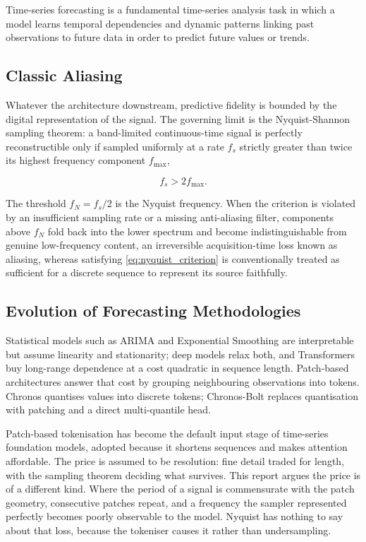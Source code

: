 Time-series forecasting is a fundamental time-series analysis task in which a model learns temporal dependencies and dynamic patterns linking past observations to future data in order to predict future values or trends\autocite{wangDeepTimeSeries2026}.

\subsection*{Classic Aliasing}
Whatever the architecture downstream, predictive fidelity is bounded by the digital representation of the signal. The governing limit is the Nyquist-Shannon sampling theorem: a band-limited continuous-time signal is perfectly reconstructible only if sampled uniformly at a rate $f_s$ strictly greater than twice its highest frequency component $f_{\max}$,

\begin{equation}
\label{eq:nyquist_criterion}
f_s > 2f_{\max}.
\end{equation}

The threshold $f_N = f_s/2$ is the Nyquist frequency. When the criterion is violated by an insufficient sampling rate or a missing anti-aliasing filter, components above $f_N$ fold back into the lower spectrum and become indistinguishable from genuine low-frequency content, an irreversible acquisition-time loss known as aliasing, whereas satisfying \autoref{eq:nyquist_criterion} is conventionally treated as sufficient for a discrete sequence to represent its source faithfully.

\subsection*{Evolution of Forecasting Methodologies}
Statistical models such as ARIMA and Exponential Smoothing\autocite[chs.~8--9]{hyndmanForecastingPrinciplesPractice2021} are interpretable but assume linearity and stationarity; deep models relax both, and Transformers buy long-range dependence at a cost quadratic in sequence length\autocite{wangDeepTimeSeries2026}. Patch-based architectures answer that cost by grouping neighbouring observations into tokens. Chronos quantises values into discrete tokens\autocite{ansariChronosLearningLanguage2024}; Chronos-Bolt replaces quantisation with patching and a direct multi-quantile head\autocite{ansariChronosLearningLanguage2024a,FastAccurateZeroshot2024a,AmazonChronosbolttinyHugging2025}.

Patch-based tokenisation has become the default input stage of time-series foundation models, adopted because it shortens sequences and makes attention affordable. The price is assumed to be resolution: fine detail traded for length, with the sampling theorem deciding what survives. This report argues the price is of a different kind. Where the period of a signal is commensurate with the patch geometry, consecutive patches repeat, and a frequency the sampler represented perfectly becomes poorly observable to the model. Nyquist has nothing to say about that loss, because the tokeniser causes it rather than undersampling.

